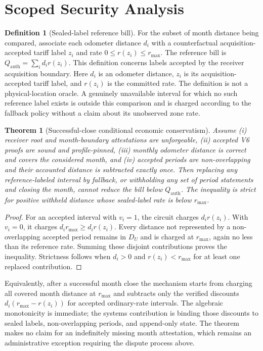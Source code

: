 \documentclass[conference]{IEEEtran}
\theoremstyle{plain}
\newtheorem{theorem}{Theorem}
\theoremstyle{definition}
\newtheorem{definition}{Definition}
\newcommand{\rmax}{r_{\max}}
\begin{document}
\section{Scoped Security Analysis}

\begin{definition}[Sealed-label reference bill]
For the subset of month distance being compared, associate each odometer
distance $d_i$ with a counterfactual acquisition-accepted tariff label $z_i$ and rate
$0\le r(z_i)\le\rmax$. The reference bill is
$Q_{\mathrm{auth}}=\sum_i d_i r(z_i)$. This definition concerns labels accepted
by the receiver acquisition boundary. Here $d_i$ is an odometer distance,
$z_i$ is its acquisition-accepted tariff label, and $r(z_i)$ is the committed rate.
The definition is not a physical-location oracle. A genuinely unavailable
interval for which no such reference label exists is outside this comparison
and is charged according to the fallback policy without a claim about its
unobserved zone rate.
\end{definition}

\begin{theorem}[Successful-close conditional economic conservatism]
\label{thm:withholding}
Assume (i) receiver root and month-boundary attestations are unforgeable,
(ii) accepted V6 proofs are sound and profile-pinned, (iii) monthly odometer
distance is correct and covers the considered month, and (iv) accepted periods
are non-overlapping and their accounted distance is subtracted exactly once.
Then replacing any reference-labeled interval by fallback, or withholding
any set of period statements and closing the month, cannot reduce the bill
below $Q_{\mathrm{auth}}$. The inequality is strict for positive withheld
distance whose sealed-label rate is below $\rmax$.
\end{theorem}

\begin{proof}
For an accepted interval with $v_i=1$, the circuit charges
$d_i r(z_i)$. With $v_i=0$, it charges $d_i\rmax\ge d_i r(z_i)$. Every distance
not represented by a non-overlapping accepted period remains in $D_U$ and is
charged at $\rmax$, again no less than its reference rate. Summing these
disjoint contributions proves the inequality. Strictness follows when
$d_i>0$ and $r(z_i)<\rmax$ for at least one replaced contribution.
\end{proof}

Equivalently, after a successful month close the mechanism starts from charging
all covered month distance at $\rmax$ and subtracts only the verified discounts
$d_i(\rmax-r(z_i))$ for accepted ordinary-rate intervals. The algebraic
monotonicity is immediate; the systems contribution is binding those discounts
to sealed labels, non-overlapping periods, and append-only state. The theorem
makes no claim for an indefinitely missing month attestation, which remains an
administrative exception requiring the dispute process above.
\end{document}
